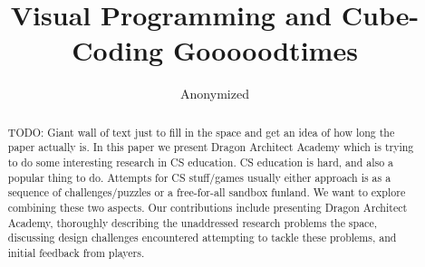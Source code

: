 \documentclass{sig-alternate}
\newcommand{\TODO}[1]{{\color{red} TODO: #1}}
\newcommand{\gametitle}{{\color{RoyalPurple} Dragon Architect Academy}}
\begin{document}
%

\title{Visual Programming and Cube-Coding Gooooodtimes}

\author{Anonymized}


\maketitle
\begin{abstract}

    \TODO{Giant wall of text just to fill in the space and get an idea of how long the paper actually is. In this paper we present \gametitle{} which is trying to do some interesting research in CS education. CS education is hard, and also a popular thing to do. Attempts for CS stuff/games usually either approach is as a sequence of challenges/puzzles or a free-for-all sandbox funland. We want to explore combining these two aspects. Our contributions include presenting \gametitle{}, thoroughly describing the unaddressed research problems the space, discussing design challenges encountered attempting to tackle these problems, and initial feedback from players.}
\end{abstract}



\end{document}
